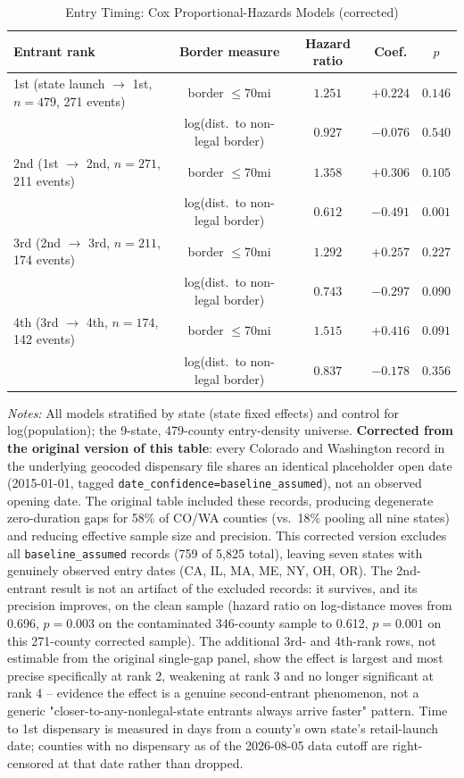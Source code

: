 \begin{table}[htbp]
\centering
\caption{Entry Timing: Cox Proportional-Hazards Models (corrected)}
\label{tab:entry_hazard}
\footnotesize
\begin{tabular}{lcccc}
\toprule
Entrant rank & Border measure & Hazard ratio & Coef. & $p$ \\
\midrule
1st (state launch $\to$ 1st, $n=479$, 271 events) & border $\le$70mi & $1.251$ & $+0.224$ & $0.146$ \\
 & log(dist.\ to non-legal border) & $0.927$ & $-0.076$ & $0.540$ \\
\midrule
2nd (1st $\to$ 2nd, $n=271$, 211 events) & border $\le$70mi & $1.358$ & $+0.306$ & $0.105$ \\
 & log(dist.\ to non-legal border) & $0.612$ & $-0.491$ & $0.001$ \\
\midrule
3rd (2nd $\to$ 3rd, $n=211$, 174 events) & border $\le$70mi & $1.292$ & $+0.257$ & $0.227$ \\
 & log(dist.\ to non-legal border) & $0.743$ & $-0.297$ & $0.090$ \\
\midrule
4th (3rd $\to$ 4th, $n=174$, 142 events) & border $\le$70mi & $1.515$ & $+0.416$ & $0.091$ \\
 & log(dist.\ to non-legal border) & $0.837$ & $-0.178$ & $0.356$ \\
\bottomrule
\end{tabular}
\begin{minipage}{0.95\textwidth}
\vspace{0.3em}
\footnotesize
\textit{Notes:} All models stratified by state (state fixed effects) and control for log(population); the
9-state, 479-county entry-density universe. \textbf{Corrected from the original version of this table}: every
Colorado and Washington record in the underlying geocoded dispensary file shares an identical placeholder
open date (2015-01-01, tagged \texttt{date\_confidence=baseline\_assumed}), not an observed opening date. The
original table included these records, producing degenerate zero-duration gaps for 58\% of CO/WA
counties (vs.\ 18\% pooling all nine states) and reducing effective sample size and precision. This corrected
version excludes all \texttt{baseline\_assumed} records (759 of 5{,}825 total), leaving seven states with
genuinely observed entry dates (CA, IL, MA, ME, NY, OH, OR). The 2nd-entrant result is not an artifact of the
excluded records: it survives, and its precision improves, on the clean sample (hazard ratio on log-distance
moves from 0.696, $p=0.003$ on the contaminated 346-county sample to 0.612, $p=0.001$ on this 271-county
corrected sample). The additional 3rd- and 4th-rank rows, not estimable from the original single-gap panel,
show the effect is largest and most precise specifically at rank 2, weakening at rank 3 and no longer
significant at rank 4 -- evidence the effect is a genuine second-entrant phenomenon, not a generic
"closer-to-any-nonlegal-state entrants always arrive faster" pattern. Time to 1st dispensary is measured in
days from a county's own state's retail-launch date; counties with no dispensary as of the 2026-08-05 data
cutoff are right-censored at that date rather than dropped.
\end{minipage}
\end{table}
